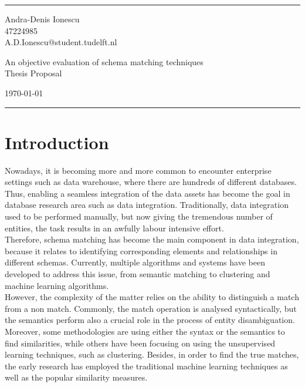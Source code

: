 \documentclass[a4paper]{article}
\begin{document}

\fancyhead[C]{}
\hrule \medskip %
\begin{minipage}{0.295\textwidth} 
\raggedright
\footnotesize
Andra-Denis Ionescu \hfill\\   
47224985 \hfill\\
A.D.Ionescu@student.tudelft.nl
\end{minipage}
\begin{minipage}{0.4\textwidth} 
\centering 
\large 
An objective evaluation of schema matching techniques\\ 
\normalsize 
Thesis Proposal\\ 
\end{minipage}
\begin{minipage}{0.295\textwidth} 
\raggedleft
\today\hfill\\
\end{minipage}
\medskip\hrule 
\bigskip


\section{Introduction}

Nowadays, it is becoming more and more common to encounter enterprise settings such as data warehouse, where there are hundreds of different databases. Thus, enabling a seamless integration of the data assets has become the goal in database research area such as data integration. Traditionally, data integration used to be performed manually, but now giving the tremendous number of entities, the task results in an awfully labour intensive effort. \\

Therefore, schema matching has become the main component in data integration, because it relates to identifying corresponding elements and relationships in different schemas. Currently, multiple algorithms and systems have been developed to address this issue, from semantic matching to clustering and machine learning algorithms. \\

However, the complexity of the matter relies on the ability to distinguish a match from a non match. Commonly, the match operation is analysed syntactically, but the semantics perform also a crucial role in the process of entity disambiguation. Moreover, some methodologies are using either the syntax or the semantics to find similarities, while others have been focusing on using the unsupervised learning techniques, such as clustering. Besides, in order to find the true matches, the early research has employed the traditional machine learning techniques as well as the popular similarity measures. \\
\end{document}
